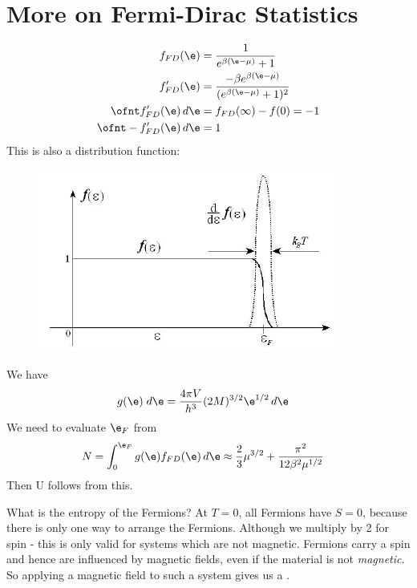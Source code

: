 \documentclass[a4paper, 11pt, normalem]{report}
\begin{document}
\section{More on Fermi-Dirac Statistics}
\begin{align}
    f_{FD}(\e) &= \frac{1}{e^{\beta(\e-\mu)}+1} \\
    f'_{FD}(\e) &= \frac{-\beta e^{\beta(\e-\mu)}}{(e^{\beta(\e-\mu)}+1)^2} \\
    \ofnt f'_{FD}(\e)\,d\e &= f_{FD}(\infty) - f(0) = -1 \\
    \ofnt -f'_{FD}(\e)\,d\e &= 1
\end{align}
This is also a distribution function:
\begin{figure}[H]
    \centering
    \includegraphics[scale=0.5]{fddash.png}
\end{figure}

\begin{example}
    We have
    \begin{align}
        g(\e)\;d\e &= \frac{4\pi V}{h^3}(2M)^{3/2} \e^{1/2}\,d\e
    \end{align}
    We need to evaluate $\e_F$ from
    \begin{align} 
        N &= \int_0^{\e_F} g(\e)f_{FD}(\e)\,d\e \approx \frac{2}{3}\mu^{3/2} + \frac{\pi^2}{12\beta^2\mu^{1/2}}
    \end{align}
    Then U follows from this.
\end{example}

What is the entropy of the Fermions?
At $T=0$, all Fermions have $S=0$, because there is only one way to arrange the Fermions.
Although we multiply by 2 for spin - this is only valid for systems which are not magnetic. 
Fermions carry a spin and hence are influenced by magnetic fields, even if the material is not \emph{magnetic}.
So applying a magnetic field to such a system gives us a .
\end{document}
